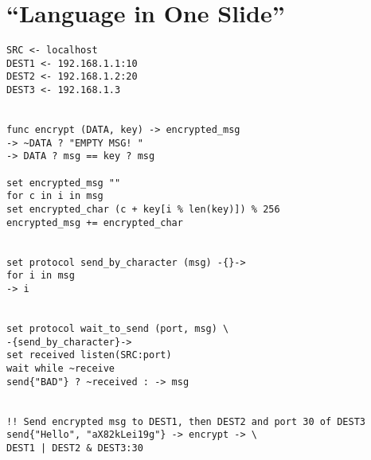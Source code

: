 \documentclass[12pt,a4paper]{article}
\begin{document}
\section{“Language in One Slide”}
\begin{lstlisting}
SRC <- localhost
DEST1 <- 192.168.1.1:10
DEST2 <- 192.168.1.2:20
DEST3 <- 192.168.1.3


func encrypt (DATA, key) -> encrypted_msg
-> ~DATA ? "EMPTY MSG! "
-> DATA ? msg == key ? msg

set encrypted_msg ""
for c in i in msg
set encrypted_char (c + key[i % len(key)]) % 256
encrypted_msg += encrypted_char


set protocol send_by_character (msg) -{}->
for i in msg
-> i


set protocol wait_to_send (port, msg) \
-{send_by_character}->
set received listen(SRC:port)
wait while ~receive
send{"BAD"} ? ~received : -> msg


!! Send encrypted msg to DEST1, then DEST2 and port 30 of DEST3
send{"Hello", "aX82kLei19g"} -> encrypt -> \
DEST1 | DEST2 & DEST3:30

\end{lstlisting}
\end{document}
